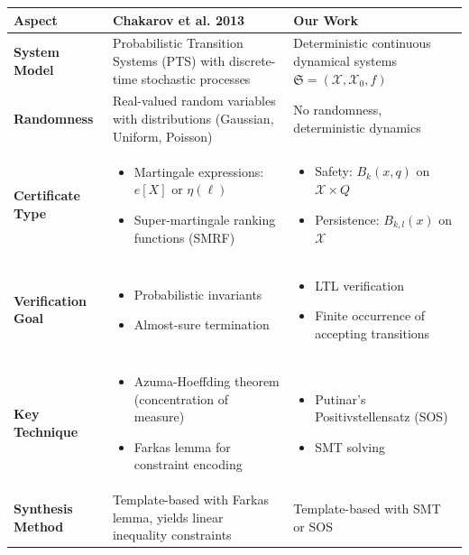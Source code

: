 \documentclass{article}
\begin{document}
\begin{center}
\begin{tabular}{|p{3.5cm}|p{5.5cm}|p{5.5cm}|}
\hline
\textbf{Aspect} & \textbf{Chakarov et al. 2013} & \textbf{Our Work} \\
\hline
\textbf{System Model} & Probabilistic Transition Systems (PTS) with discrete-time stochastic processes & Deterministic continuous dynamical systems $\mathfrak{S} = (\mathcal{X}, \mathcal{X}_0, f)$ \\
\hline
\textbf{Randomness} & Real-valued random variables with distributions (Gaussian, Uniform, Poisson) & No randomness, deterministic dynamics \\
\hline
\textbf{Certificate Type} &
\begin{itemize}
\item Martingale expressions: $e[X]$ or $\eta(\ell)$
\item Super-martingale ranking functions (SMRF)
\end{itemize} &
\begin{itemize}
\item Safety: $B_k(x, q)$ on $\mathcal{X} \times Q$
\item Persistence: $B_{k,l}(x)$ on $\mathcal{X}$
\end{itemize} \\
\hline
\textbf{Verification Goal} &
\begin{itemize}
\item Probabilistic invariants
\item Almost-sure termination
\end{itemize} &
\begin{itemize}
\item LTL verification
\item Finite occurrence of accepting transitions
\end{itemize} \\
\hline
\textbf{Key Technique} &
\begin{itemize}
\item Azuma-Hoeffding theorem (concentration of measure)
\item Farkas lemma for constraint encoding
\end{itemize} &
\begin{itemize}
\item Putinar's Positivstellensatz (SOS)
\item SMT solving
\end{itemize} \\
\hline
\textbf{Synthesis Method} & Template-based with Farkas lemma, yields linear inequality constraints & Template-based with SMT or SOS \\

\end{tabular}
\end{center}
\end{document}
